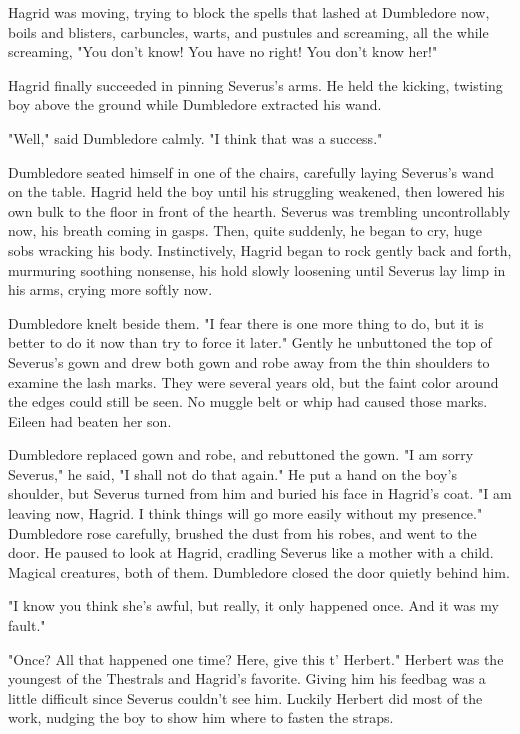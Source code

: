 Hagrid was moving, trying to block the spells that lashed at Dumbledore now, boils and blisters, carbuncles, warts, and pustules{\el} and screaming, all the while screaming, "You don't know! You have no right! You don't know her!"

Hagrid finally succeeded in pinning Severus's arms. He held the kicking, twisting boy above the ground while Dumbledore extracted his wand.

"Well," said Dumbledore calmly. "I think that was a success."

Dumbledore seated himself in one of the chairs, carefully laying Severus's wand on the table. Hagrid held the boy until his struggling weakened, then lowered his own bulk to the floor in front of the hearth. Severus was trembling uncontrollably now, his breath coming in gasps. Then, quite suddenly, he began to cry, huge sobs wracking his body. Instinctively, Hagrid began to rock gently back and forth, murmuring soothing nonsense, his hold slowly loosening until Severus lay limp in his arms, crying more softly now.

Dumbledore knelt beside them. "I fear there is one more thing to do, but it is better to do it now than try to force it later." Gently he unbuttoned the top of Severus's gown and drew both gown and robe away from the thin shoulders to examine the lash marks. They were several years old, but the faint color around the edges could still be seen. No muggle belt or whip had caused those marks. Eileen had beaten her son.

Dumbledore replaced gown and robe, and rebuttoned the gown. "I am sorry Severus," he said, "I shall not do that again." He put a hand on the boy's shoulder, but Severus turned from him and buried his face in Hagrid's coat. "I am leaving now, Hagrid. I think things will go more easily without my presence." Dumbledore rose carefully, brushed the dust from his robes, and went to the door. He paused to look at Hagrid, cradling Severus like a mother with a child. Magical creatures, both of them. Dumbledore closed the door quietly behind him.

"I know you think she's awful, but really, it only happened once. And it was my fault."

"Once? All that happened one time? Here, give this t' Herbert." Herbert was the youngest of the Thestrals and Hagrid's favorite. Giving him his feedbag was a little difficult since Severus couldn't see him. Luckily Herbert did most of the work, nudging the boy to show him where to fasten the straps.

